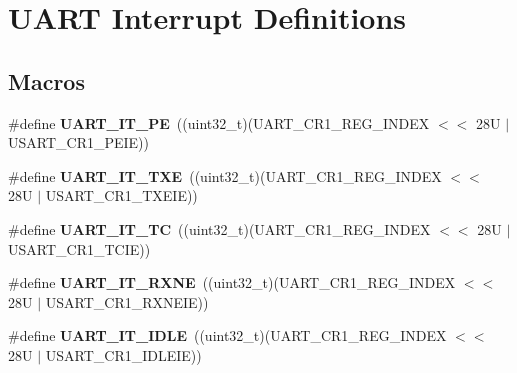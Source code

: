 \hypertarget{group___u_a_r_t___interrupt__definition}{}\section{U\+A\+RT Interrupt Definitions}
\label{group___u_a_r_t___interrupt__definition}
\subsection*{Macros}
\begin{DoxyCompactItemize}
\item 
\mbox{\label{group___u_a_r_t___interrupt__definition_ga55f922ddcf513509710ade5d7c40a1db}} 
\#define {\bfseries U\+A\+R\+T\+\_\+\+I\+T\+\_\+\+PE}~((uint32\+\_\+t)(U\+A\+R\+T\+\_\+\+C\+R1\+\_\+\+R\+E\+G\+\_\+\+I\+N\+D\+EX $<$$<$ 28\+U $\vert$ U\+S\+A\+R\+T\+\_\+\+C\+R1\+\_\+\+P\+E\+I\+E))
\item 
\mbox{\label{group___u_a_r_t___interrupt__definition_ga552636e2af516d578856f5ee2ba71ed7}} 
\#define {\bfseries U\+A\+R\+T\+\_\+\+I\+T\+\_\+\+T\+XE}~((uint32\+\_\+t)(U\+A\+R\+T\+\_\+\+C\+R1\+\_\+\+R\+E\+G\+\_\+\+I\+N\+D\+EX $<$$<$ 28\+U $\vert$ U\+S\+A\+R\+T\+\_\+\+C\+R1\+\_\+\+T\+X\+E\+I\+E))
\item 
\mbox{\label{group___u_a_r_t___interrupt__definition_gab9a4dc4e8cea354fd60f4117513b2004}} 
\#define {\bfseries U\+A\+R\+T\+\_\+\+I\+T\+\_\+\+TC}~((uint32\+\_\+t)(U\+A\+R\+T\+\_\+\+C\+R1\+\_\+\+R\+E\+G\+\_\+\+I\+N\+D\+EX $<$$<$ 28\+U $\vert$ U\+S\+A\+R\+T\+\_\+\+C\+R1\+\_\+\+T\+C\+I\+E))
\item 
\mbox{\label{group___u_a_r_t___interrupt__definition_gac1bedf7a65eb8c3f3c4b52bdb24b139d}} 
\#define {\bfseries U\+A\+R\+T\+\_\+\+I\+T\+\_\+\+R\+X\+NE}~((uint32\+\_\+t)(U\+A\+R\+T\+\_\+\+C\+R1\+\_\+\+R\+E\+G\+\_\+\+I\+N\+D\+EX $<$$<$ 28\+U $\vert$ U\+S\+A\+R\+T\+\_\+\+C\+R1\+\_\+\+R\+X\+N\+E\+I\+E))
\item 
\mbox{\label{group___u_a_r_t___interrupt__definition_ga9781808d4f9999061fc2da36572191d9}} 
\#define {\bfseries U\+A\+R\+T\+\_\+\+I\+T\+\_\+\+I\+D\+LE}~((uint32\+\_\+t)(U\+A\+R\+T\+\_\+\+C\+R1\+\_\+\+R\+E\+G\+\_\+\+I\+N\+D\+EX $<$$<$ 28\+U $\vert$ U\+S\+A\+R\+T\+\_\+\+C\+R1\+\_\+\+I\+D\+L\+E\+I\+E))
$$
\end{DoxyCompactItemize}
